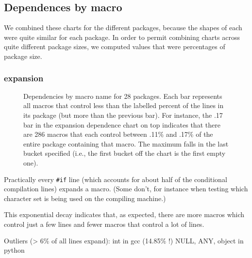 \documentclass[10pt]{article}
\begin{document}
      

\subsection{Dependences by macro}

    We combined these charts for the different packages, because the shapes
      of each were quite similar for each package.  In order to permit
      combining charts across quite different package sizes, we computed
      values that were percentages of package size.

   \subsubsection{expansion}

\begin{figure}
\centerline{}
\bigskip
\centerline{}
\caption{Dependencies by macro name for 28 packages.
  Each bar represents all macros that control less than the labelled
  percent of the lines in its package (but more than the previous bar).
  For instance, the .17 bar in the expansion dependence chart on top
  indicates that there are 286 macros that each control between .11\%
  and .17\% of the entire package containing that macro.  The maximum
  falls in the last bucket specified (i.e., the first bucket off the
  chart is the first empty one).}

\label{fig:dep-bymacro}
\end{figure}

Practically every {\tt \#if} line (which accounts for about half of the
conditional compilation lines) expands a macro.  (Some don't, for instance
when testing which character set is being used on the compiling machine.)

        This exponential decay indicates that, as expected, there are more
          macros which control just a few lines and fewer macros that
          control a lot of lines.

        Outliers (> 6\% of all lines expand):
          int in gcc (14.85\% !)
          NULL, ANY, object in python
\end{document}
